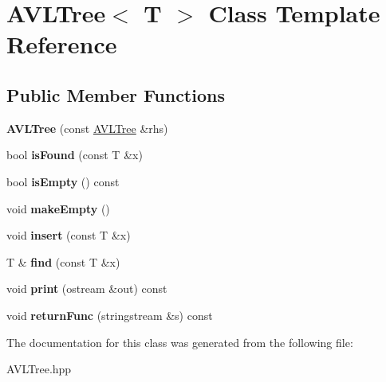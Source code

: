 \hypertarget{class_a_v_l_tree}{\section{A\+V\+L\+Tree$<$ T $>$ Class Template Reference}
\label{class_a_v_l_tree}
}
\subsection*{Public Member Functions}
\begin{DoxyCompactItemize}
\item 
\hypertarget{class_a_v_l_tree_a661fdb05fd0bc8157be56ea729574c38}{{\bfseries A\+V\+L\+Tree} (const \hyperlink{class_a_v_l_tree}{A\+V\+L\+Tree} \&rhs)}\label{class_a_v_l_tree_a661fdb05fd0bc8157be56ea729574c38}

\item 
\hypertarget{class_a_v_l_tree_adf815f7c7638434224d13cd3845dbab0}{bool {\bfseries is\+Found} (const T \&x)}\label{class_a_v_l_tree_adf815f7c7638434224d13cd3845dbab0}

\item 
\hypertarget{class_a_v_l_tree_a078448aa96485249b15fdee43a504ee4}{bool {\bfseries is\+Empty} () const }\label{class_a_v_l_tree_a078448aa96485249b15fdee43a504ee4}

\item 
\hypertarget{class_a_v_l_tree_ab7062b17bcc409f0b9200671482fad01}{void {\bfseries make\+Empty} ()}\label{class_a_v_l_tree_ab7062b17bcc409f0b9200671482fad01}

\item 
\hypertarget{class_a_v_l_tree_aa8f3199f54f1e2a4d9ae0ac16be2344b}{void {\bfseries insert} (const T \&x)}\label{class_a_v_l_tree_aa8f3199f54f1e2a4d9ae0ac16be2344b}

\item 
\hypertarget{class_a_v_l_tree_a5e64e3b797903ffd4d5b8bc4b0adb2f4}{T \& {\bfseries find} (const T \&x)}\label{class_a_v_l_tree_a5e64e3b797903ffd4d5b8bc4b0adb2f4}

\item 
\hypertarget{class_a_v_l_tree_a6591eaa28e62eb1f7ea5dae21ddc4244}{void {\bfseries print} (ostream \&out) const }\label{class_a_v_l_tree_a6591eaa28e62eb1f7ea5dae21ddc4244}

\item 
\hypertarget{class_a_v_l_tree_ad3f2b1b4aa3b55088e81e2c51c88bc2e}{void {\bfseries return\+Func} (stringstream \&s) const }\label{class_a_v_l_tree_ad3f2b1b4aa3b55088e81e2c51c88bc2e}

\end{DoxyCompactItemize}


The documentation for this class was generated from the following file\+:\begin{DoxyCompactItemize}
\item 
A\+V\+L\+Tree.\+hpp\end{DoxyCompactItemize}
